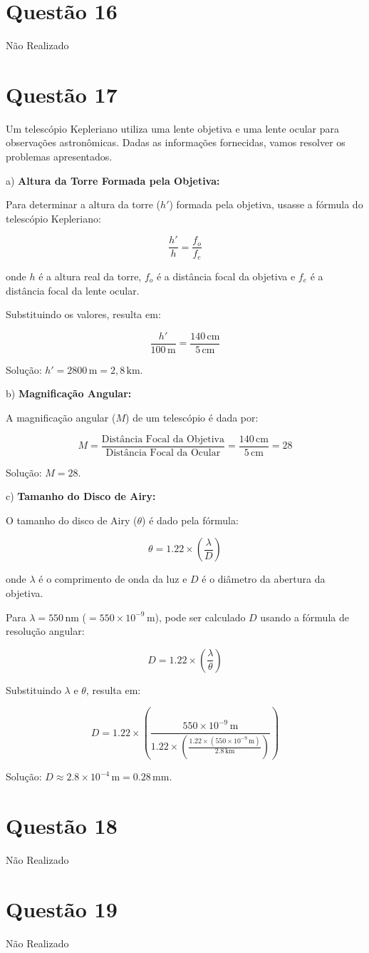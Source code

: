 \documentclass[a4paper, 12pt]{article}
\begin{document}
\section*{Questão 16}
Não Realizado
\section*{Questão 17}
Um telescópio Kepleriano utiliza uma lente objetiva e uma lente ocular para observações astronômicas. Dadas as informações fornecidas, vamos resolver os problemas apresentados.

a) \textbf{Altura da Torre Formada pela Objetiva:}

Para determinar a altura da torre (\(h'\)) formada pela objetiva, usasse a fórmula do telescópio Kepleriano:

\[
\frac{h'}{h} = \frac{f_o}{f_e}
\]

onde \(h\) é a altura real da torre, \(f_o\) é a distância focal da objetiva e \(f_e\) é a distância focal da lente ocular.

Substituindo os valores, resulta em:

\[
\frac{h'}{100 \, \text{m}} = \frac{140 \, \text{cm}}{5 \, \text{cm}}
\]

Solução: \(h' = 2800 \, \text{m} = 2,8 \, \text{km}\).

b) \textbf{Magnificação Angular:}

A magnificação angular (\(M\)) de um telescópio é dada por:

\[
M = \frac{\text{Distância Focal da Objetiva}}{\text{Distância Focal da Ocular}} = \frac{140 \, \text{cm}}{5 \, \text{cm}} = 28
\]

Solução: \(M = 28\).

c) \textbf{Tamanho do Disco de Airy:}

O tamanho do disco de Airy (\(\theta\)) é dado pela fórmula:

\[
\theta = 1.22 \times \left( \frac{\lambda}{D} \right)
\]

onde \(\lambda\) é o comprimento de onda da luz e \(D\) é o diâmetro da abertura da objetiva. 

Para \(\lambda = 550 \, \text{nm}\) (\(= 550 \times 10^{-9} \, \text{m}\)), pode ser calculado \(D\) usando a fórmula de resolução angular:

\[
D = 1.22 \times \left( \frac{\lambda}{\theta} \right)
\]

Substituindo \(\lambda\) e \(\theta\), resulta em:

\[
D = 1.22 \times \left( \frac{550 \times 10^{-9} \, \text{m}}{1.22 \times \left( \frac{1.22 \times (550 \times 10^{-9} \, \text{m})}{2.8 \, \text{km}} \right)} \right)
\]

Solução: \(D \approx 2.8 \times 10^{-4} \, \text{m} = 0.28 \, \text{mm}\).

\section*{Questão 18}
Não Realizado

\section*{Questão 19}
Não Realizado
\end{document}
